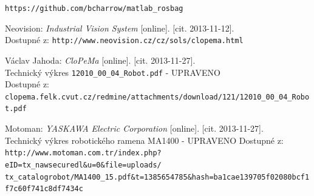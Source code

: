 \documentclass[10pt,a4paper,titlepage,oneside]{report}
\begin{document}
\begin{thebibliography}{00}
\verb|https://github.com/bcharrow/matlab_rosbag|

   Neovision:
    \emph{Industrial Vision System} [online]. [cit. 2013-11-12].\\
    Dostupné z: \verb|http://www.neovision.cz/cz/sols/clopema.html|    

   Václav Jahoda:
    \emph{CloPeMa} [online]. [cit. 2013-11-27].\\
    Technický výkres \verb|12010_00_04_Robot.pdf| - UPRAVENO\\
    Dostupné z: \verb|clopema.felk.cvut.cz/redmine/attachments/download/121/12010_00_04_Robot.pdf|    

   Motoman:
    \emph{YASKAWA Electric Corporation} [online]. [cit. 2013-11-27].\\
    Technický výkres robotického ramena MA1400 - UPRAVENO
    Dostupné z: \verb|http://www.motoman.com.tr/index.php?eID=tx_nawsecuredl&u=0&file=uploads/|\\
    \verb|tx_catalogrobot/MA1400_15.pdf&t=1385654785&hash=ba1cae139705f02080bcf1f7c60f741c8df7434c| 
\end{thebibliography}
\end{document}
